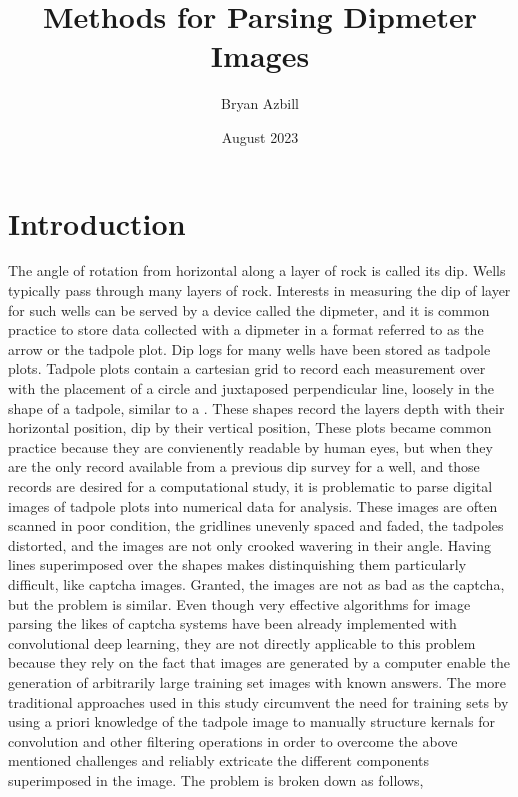 \documentclass{article}
\title{Methods for Parsing Dipmeter Images }
\date{August 2023}
\author{Bryan Azbill}
\begin{document}
\maketitle 
\section{Introduction}
The angle of rotation from horizontal along a layer of rock is called its dip. Wells typically pass through many layers of rock. Interests in measuring the dip of layer for such wells can be served by a device called the dipmeter, and it is common practice to store data collected with a dipmeter in a format referred to as the arrow or the tadpole plot. 
Dip logs for many wells have been stored as tadpole plots. Tadpole plots contain a cartesian grid to record each measurement over with the placement of a circle and juxtaposed perpendicular line, loosely in the shape of a tadpole, similar to a  \male . These shapes record the layers depth with their horizontal position, dip by their vertical position, 
These plots became common practice because they are convienently readable by human eyes, but when they are the only record available from a previous dip survey for a well, and those records are desired for a computational study, it is problematic to parse digital images of tadpole plots into numerical data for analysis.
These images are often scanned in poor condition, the gridlines unevenly spaced and faded, the tadpoles distorted, and the images are not only crooked wavering in their angle. Having lines superimposed over the shapes makes distinquishing them particularly difficult, like captcha images. 
Granted, the images are not as bad as the captcha,  but the problem is similar. Even though very effective algorithms for image parsing the likes of captcha systems have been already implemented with convolutional deep learning, they are not directly applicable to this problem because they rely on the fact that images are generated by a computer
enable the generation of arbitrarily large training set images with known answers. The more traditional approaches used in this study circumvent the need for training sets by using a priori knowledge of the tadpole image to manually structure kernals for convolution and other filtering operations
in order to overcome the above mentioned challenges and reliably extricate the different components superimposed in the image.  The problem is broken down as follows,
\end{document}
